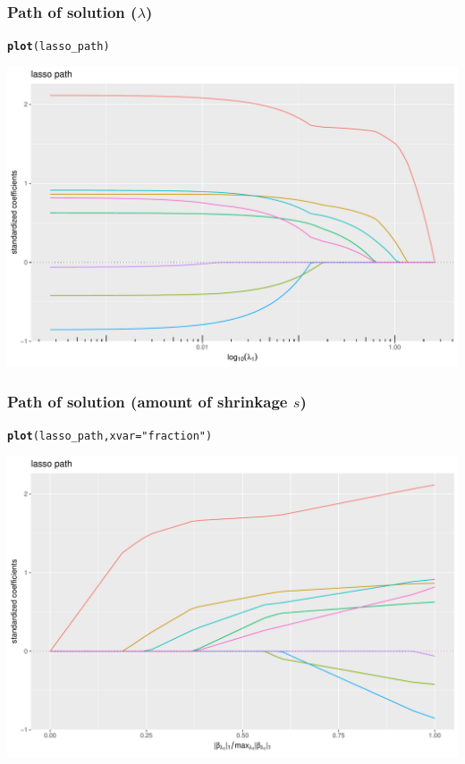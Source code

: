 \documentclass{beamer}\usepackage[]{graphicx}\usepackage[]{color}
\makeatletter
\newcommand{\hlstr}[1]{\textcolor[rgb]{0.192,0.494,0.8}{#1}}%
\newcommand{\hlstd}[1]{\textcolor[rgb]{0.345,0.345,0.345}{#1}}%
\newcommand{\hlkwc}[1]{\textcolor[rgb]{0.333,0.667,0.333}{#1}}%
\newcommand{\hlkwd}[1]{\textcolor[rgb]{0.737,0.353,0.396}{\textbf{#1}}}%
\newenvironment{kframe}{%
 \def\at@end@of@kframe{}%
 \ifinner\ifhmode%
  \def\at@end@of@kframe{\end{minipage}}%
  \begin{minipage}{\columnwidth}%
 \fi\fi%
 \def\FrameCommand##1{\hskip\@totalleftmargin \hskip-\fboxsep
 \colorbox{shadecolor}{##1}\hskip-\fboxsep
     \hskip-\linewidth \hskip-\@totalleftmargin \hskip\columnwidth}%
 \MakeFramed {\advance\hsize-\width
   \@totalleftmargin\z@ \linewidth\hsize
   \@setminipage}}%
 {\par\unskip\endMakeFramed%
 \at@end@of@kframe}
\newenvironment{knitrout}{}{} %
\makeatother
\begin{document}
\begin{frame}[containsverbatim]
  \frametitle{Path of solution ($\lambda$)}

\begin{knitrout}\scriptsize
{}\color{fgcolor}\begin{kframe}
\begin{alltt}
\hlkwd{plot}\hlstd{(lasso_path)}
\end{alltt}
\end{kframe}
\includegraphics[width=.8\textwidth]{figures/unnamed-chunk-30-1} 

\end{knitrout}
\end{frame}


\begin{frame}[containsverbatim]
  \frametitle{Path of solution (amount of shrinkage $s$)}

\begin{knitrout}\scriptsize
{}\color{fgcolor}\begin{kframe}
\begin{alltt}
\hlkwd{plot}\hlstd{(lasso_path,} \hlkwc{xvar}\hlstd{=}\hlstr{"fraction"}\hlstd{)}
\end{alltt}
\end{kframe}
\includegraphics[width=.8\textwidth]{figures/unnamed-chunk-31-1} 

\end{knitrout}
\end{frame}
\end{document}
